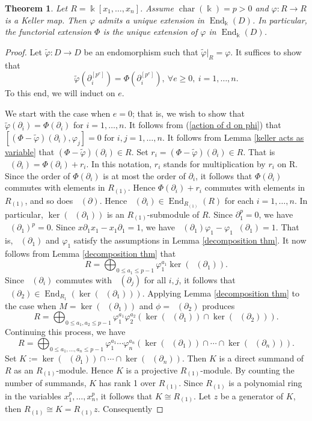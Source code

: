 \documentclass[11pt]{amsart}
\newtheorem{theorem}{Theorem}[section]
\theoremstyle{definition}
\theoremstyle{remark}
\numberwithin{equation}{subsection}
\DeclareMathOperator{\kk}{\Bbbk}
\DeclareMathOperator{\tv}{\tilde{\varphi}}
\DeclareMathOperator{\ch}{char}
\DeclareMathOperator{\End}{End}
\begin{document}
\begin{theorem}
\label{keller admit unique ext in char p}
Let $R=\kk[x_1,\dots,x_n]$. Assume $\ch(\kk)=p>0$ and $\varphi:R\to R$ is a Keller map. Then $\varphi$ admits a unique extension in $\End_{\kk}(D)$. In particular, the functorial extension $\Phi$ is the unique extension of $\varphi$ in $\End_{\kk}(D)$.
\end{theorem}
\begin{proof}
Let $\tilde{\varphi}:D\to D$ be an endomorphism such that $\tilde{\varphi}|_R=\varphi$. It suffices to show that
\[\tilde{\varphi}(\partial^{[p^e]}_i)=\Phi(\partial_i^{[p^e]}),\ \forall e\geq 0,\ i=1,\dots,n.\]
To this end, we will induct on $e$.

We start with the case when $e=0$; that is, we wish to show that $\tilde{\varphi}(\partial_i)=\Phi(\partial_i)$ for $i=1,\dots,n$. It follows from (\ref{action of d on phi}) that $[(\Phi-\tilde{\varphi})(\partial_i),\varphi_j]=0$ for $i,j=1,\dots,n$. It follows from Lemma \ref{keller acts as variable} that $(\Phi-\tilde{\varphi})(\partial_i)\in R$. Set $r_i=(\Phi-\tilde{\varphi})(\partial_i)\in R$. That is $\tv(\partial_i)=\Phi(\partial_i)+r_i$. In this notation, $r_i$ stands for multiplication by $r_i$ on R. Since the order of $\Phi(\partial_i)$ is at most the order of $\partial_i$, it follows that $\Phi(\partial_i)$ commutes with elements in $R_{(1)}$. Hence $\Phi(\partial_i)+r_i$ commutes with elements in $R_{(1)}$, and so does $\tv(\partial)$. Hence $\tv(\partial_i)\in \End_{R_{(1)}}(R)$ for each $i=1,\dots,n$. In particular, $\ker(\tv(\partial_1))$ is an $R_{(1)}$-submodule of $R$. Since $\partial^p_1=0$, we have $\tv(\partial_1)^p=0$. Since $x\partial_1x_1-x_1\partial_1=1$, we have $\tv(\partial_1)\varphi_1-\varphi_1\tv(\partial_1)=1$. That is, $\tv(\partial_1)$ and $\varphi_1$ satisfy the assumptions in Lemma \ref{decomposition thm}. It now follows from Lemma \ref{decomposition thm} that 
\[R= \bigoplus_{0\leq a_1\leq p-1}\varphi_1^{a_1}\ker(\tv(\partial_1)).\]
Since $\tv(\partial_i)$ commutes with $\tv(\partial_j)$ for all $i,j$, it follows that $\tv(\partial_2)\in \End_{R_1}(\ker(\tv(\partial_1)))$. Applying Lemma \ref{decomposition thm} to the case when $M=\ker(\tv(\partial_1))$ and $\phi=\tv(\partial_2)$ produces
\[R= \bigoplus_{0\leq a_1,a_2\leq p-1}\varphi_1^{a_1}\varphi^{a_2}_2\left(\ker(\tv(\partial_1))\cap \ker(\tv(\partial_2))\right).\]
Continuing this process, we have
\[R= \bigoplus_{0\leq a_1,\dots,a_n\leq p-1}\varphi_1^{a_1}\cdots \varphi^{a_n}_n\left(\ker(\tv(\partial_1))\cap\cdots \cap \ker(\tv(\partial_n))\right).\]
Set $K:=\ker(\tv(\partial_1))\cap\cdots \cap \ker(\tv(\partial_n))$. Then $K$ is a direct summand of $R$ as an $R_{(1)}$-module. Hence $K$ is a projective $R_{(1)}$-module. By counting the number of summands, $K$ has rank 1 over $R_{(1)}$. Since $R_{(1)}$ is a polynomial ring in the variables $x^p_1,\dots,x^p_n$, it follows that $K\cong R_{(1)}$. Let $z$ be a generator of $K$, then $R_{(1)}\cong K=R_{(1)}z$. Consequently


\end{proof}
\end{document}
